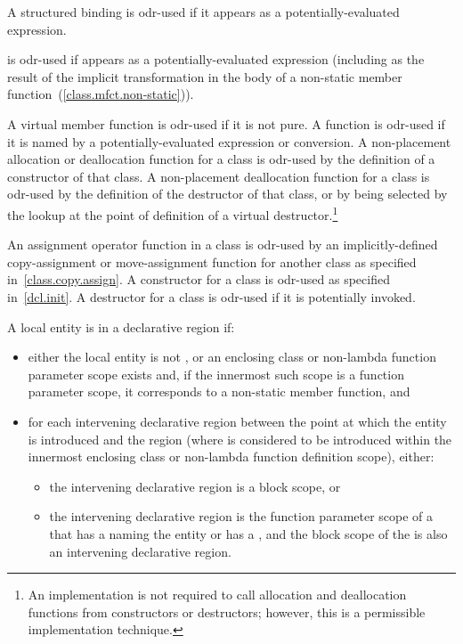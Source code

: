 \pnum
A structured binding is odr-used if it appears as a potentially-evaluated expression.

\pnum
{} is odr-used if  appears as a potentially-evaluated expression
(including as the result of the implicit transformation in the body of a non-static
member function~(\ref{class.mfct.non-static})).

\pnum
A virtual member
function is odr-used if it is not pure.
A function is odr-used if it is named by
a potentially-evaluated expression or conversion.
A non-placement allocation or deallocation
function for a class is odr-used by the definition of a constructor of that
class. A non-placement deallocation function for a class is odr-used by the
definition of the destructor of that class, or by being selected by the
lookup at the point of definition of a virtual
destructor.\footnote{An implementation is not required
to call allocation and
deallocation functions from constructors or destructors; however, this
is a permissible implementation technique.}

\pnum
An assignment operator function in a class is odr-used by an
implicitly-defined
copy-assignment or move-assignment function for another class as specified
in~\ref{class.copy.assign}.
A constructor for a class is odr-used as specified
in~\ref{dcl.init}. A destructor for a class is odr-used if it is potentially
invoked.

\pnum
A local entity
is  in a declarative region if:
\begin{itemize}
\item either the local entity is not , or
an enclosing class or non-lambda function parameter scope exists and,
if the innermost such scope is a function parameter scope,
it corresponds to a non-static member function, and
\item
for each intervening declarative region
between the point at which the entity is introduced and the region
(where  is considered to be introduced
within the innermost enclosing class or non-lambda function definition scope),
either:
\begin{itemize}
\item the intervening declarative region is a block scope, or
\item the intervening declarative region is the function parameter scope of a 
that has a 
naming the entity or has a , and
the block scope of the 
is also an intervening declarative region.
\end{itemize}
\end{itemize}

